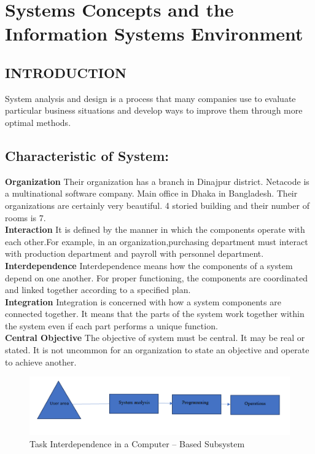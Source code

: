 \documentclass[a4paper,12pt]{report}
\begin{document}
\chapter{Systems Concepts and the Information Systems Environment}
\section{INTRODUCTION}
 System analysis and design is a process that many companies use to evaluate particular business situations and develop ways to improve them through more optimal methods.\\
 
\section {Characteristic of System:}
\textbf{Organization}
Their organization has a branch in Dinajpur district. Netacode is a multinational software company. Main office in Dhaka in Bangladesh. Their organizations are certainly very beautiful. 4 storied building and their number of rooms is 7.\\

\textbf{Interaction}
It is defined by the manner in which the components operate with each other.For example, in an organization,purchasing department must interact with production department and payroll with personnel department.\\

\textbf{Interdependence}
Interdependence means how the components of a system depend on one another. For proper functioning, the components are coordinated and linked together according to a specified plan. \\

\textbf{Integration}
Integration is concerned with how a system components are connected together. It means that the parts of the system work together within the system even if each part performs a unique function.\\

\textbf{Central Objective}
The objective of system must be central. It may be real or stated. It is not uncommon for an organization to state an objective and operate to achieve another.\\
\begin{figure}[h]
	\centering
	\includegraphics[width=0.7\linewidth]{1}
	\caption{Task Interdependence in a Computer – Based Subsystem }
	\label{fig:1}
\end{figure}
\end{document}
